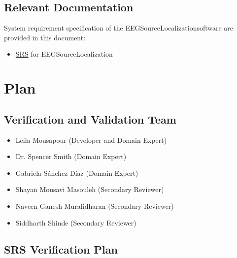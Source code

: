 \documentclass[12pt, titlepage]{article}
\renewcommand{\progname}{EEGSourceLocalization}
\begin{document}

\subsection{Relevant Documentation}

System requirement specification of the \progname software are provided in this document:
\begin{itemize}
	\item 
	\href{https://github.com/LeilaMousapour/Brain-Computer-Interface-/blob/master/docs/SRS/SRS.pdf}{SRS} 
	for \progname{}
\end{itemize}


\section{Plan}
	
\subsection{Verification and Validation Team}

\begin{itemize}
	\item Leila Mousapour (Developer and Domain Expert)
	\item Dr. Spencer Smith (Domain Expert)
	\item Gabriela Sánchez Díaz (Domain Expert)
	\item Shayan Mousavi Masouleh (Secondary Reviewer)
	\item Naveen Ganesh Muralidharan (Secondary Reviewer)
	\item Siddharth Shinde (Secondary Reviewer)
\end{itemize}
	
\subsection{SRS Verification Plan}
\end{document}

